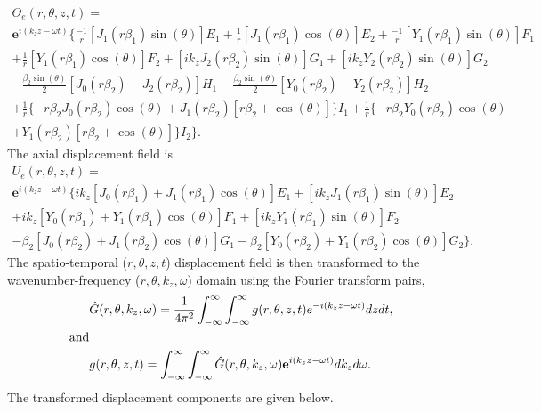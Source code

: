 \documentclass[11pt,cleanfoot]{asme2ej}
\begin{document}
\begin{multline}
    \Theta_e(r,\theta,z,t) =\\ \mathbf{e}^{i(k_{z}z-\omega t)}\bigg\{\frac{-1}{r}[J_1(r\beta_1)\sin(\theta)]E_1 + \frac{1}{r}[J_1(r\beta_1)\cos(\theta)]E_2 + \frac{-1}{r}[Y_1(r\beta_1)\sin(\theta)]F_1\\ + \frac{1}{r}[Y_1(r\beta_1)\cos(\theta)]F_2 + [ik_zJ_2(r\beta_2)\sin(\theta)]G_1 + [ik_zY_2(r\beta_2)\sin(\theta)]G_2\\ - \frac{\beta_2\sin(\theta)}{2}[J_0(r\beta_2)-J_2(r\beta_2)]H_1 - \frac{\beta_2\sin(\theta)}{2}[Y_0(r\beta_2)-Y_2(r\beta_2)]H_2\\ + \frac{1}{r}\{-r\beta_2J_0(r\beta_2)\cos(\theta) + J_1(r\beta_2)[r\beta_2+\cos(\theta)]\}I_1 + \frac{1}{r}\{-r\beta_2Y_0(r\beta_2)\cos(\theta)\\ + Y_1(r\beta_2)[r\beta_2+\cos(\theta)]\}I_2\bigg\}.
\end{multline}
The axial displacement field is
\begin{multline}
    U_e(r,\theta,z,t) =\\ \mathbf{e}^{i(k_{z}z-\omega t)}\bigg\{ik_z[J_{0}(r\beta_1) + J_{1}(r\beta_1)\cos(\theta)]E_1 + [ik_zJ_{1}(r\beta_1)\sin(\theta)]E_2\\ +  ik_z[Y_{0}(r\beta_1) + Y_{1}(r\beta_1)\cos(\theta)]F_1 +[ik_zY_{1}(r\beta_1)\sin(\theta)]F_2 \\
    - \beta_2[J_{0}(r\beta_2) + J_{1}(r\beta_2)\cos(\theta)]G_1 - \beta_2[Y_{0}(r\beta_2) + Y_{1}(r\beta_2)\cos(\theta)]G_2\bigg\}.
\end{multline}
The spatio-temporal ($r, \theta, z, t$) displacement field is then transformed to the wavenumber-frequency ($r, \theta, k_z, \omega$) domain using the Fourier transform pairs,
\begin{align}\label{Forward fourier transform}
    &\Hat{G}(r,\theta,k_{z},\omega) = \frac{1}{4\pi^{2}}\int^{\infty}_{-\infty}\int^{\infty}_{-\infty}g(r,\theta,z,t)e^{-i(k_{z}z-\omega t)}dzdt,\\
	\text{and}\nonumber \\
    &g(r,\theta,z,t) = \int^{\infty}_{-\infty}\int^{\infty}_{-\infty}\Hat{G}(r,\theta,k_{z},\omega)\mathbf{e}^{i(k_{z}z-\omega t)}dk_{z}d\omega\label{Backward fourier transform}.
\end{align} 
The transformed displacement components are given below.
\end{document}
